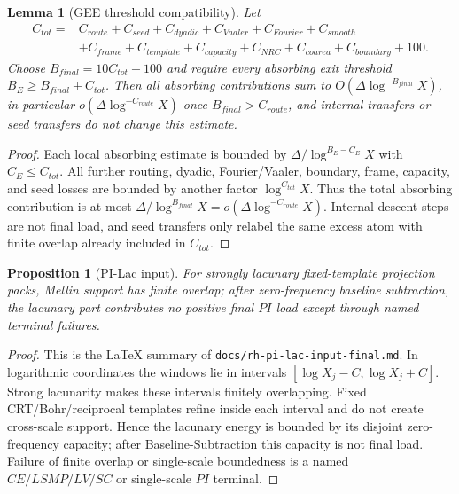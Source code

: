 \documentclass[11pt]{article}
\newtheorem{proposition}[theorem]{Proposition}
\newtheorem{lemma}[theorem]{Lemma}
\theoremstyle{definition}
\begin{document}
\begin{lemma}[GEE threshold compatibility]\label{lem:gee-threshold}
Let
\[
\begin{aligned}
 C_{tot}={}&C_{route}+C_{seed}+C_{dyadic}+C_{Vaaler}+C_{Fourier}+C_{smooth}\\
 &+C_{frame}+C_{template}+C_{capacity}+C_{NRC}+C_{coarea}+C_{boundary}+100.
\end{aligned}
\]
Choose $B_{final}=10C_{tot}+100$ and require every absorbing exit threshold $B_E\ge B_{final}+C_{tot}$.  Then all absorbing contributions sum to $O(\Delta\log^{-B_{final}}X)$, in particular $o(\Delta\log^{-C_{route}}X)$ once $B_{final}>C_{route}$, and internal transfers or seed transfers do not change this estimate.
\end{lemma}
\begin{proof}
Each local absorbing estimate is bounded by $\Delta/\log^{B_E-C_E}X$ with $C_E\le C_{tot}$.  All further routing, dyadic, Fourier/Vaaler, boundary, frame, capacity, and seed losses are bounded by another factor $\log^{C_{tot}}X$.  Thus the total absorbing contribution is at most $\Delta/\log^{B_{final}}X=o(\Delta\log^{-C_{route}}X)$.  Internal descent steps are not final load, and seed transfers only relabel the same excess atom with finite overlap already included in $C_{tot}$.
\end{proof}




\begin{proposition}[PI-Lac input]
For strongly lacunary fixed-template projection packs, Mellin support has finite overlap; after zero-frequency baseline subtraction, the lacunary part contributes no positive final $PI$ load except through named terminal failures.
\end{proposition}
\begin{proof}
This is the LaTeX summary of \texttt{docs/rh-pi-lac-input-final.md}.  In logarithmic coordinates the windows lie in intervals $[\log X_j-C,\log X_j+C]$.  Strong lacunarity makes these intervals finitely overlapping.  Fixed CRT/Bohr/reciprocal templates refine inside each interval and do not create cross-scale support.  Hence the lacunary energy is bounded by its disjoint zero-frequency capacity; after Baseline-Subtraction this capacity is not final load.  Failure of finite overlap or single-scale boundedness is a named $CE/LSMP/LV/SC$ or single-scale $PI$ terminal.
\end{proof}
\end{document}
